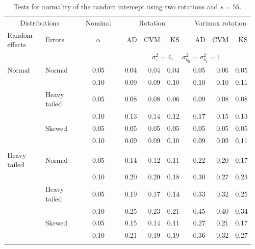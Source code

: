 \documentclass[12pt]{article} %
\begin{document}
\begin{table}[ht]
\caption{Tests for normality of the random intercept using two rotations and $s = 55$.}
\begin{scriptsize}
\begin{center}
\begin{tabular}{ll p{.1cm} c p{.1cm} rrr p{.1cm} rrr}
  \hline
  \multicolumn{2}{c}{Distributions}& & Nominal & &  \multicolumn{3}{c}{Rotation} & & \multicolumn{3}{c}{Varimax rotation} \\ \cline{1-2} \cline{6-8} \cline{10-12}   
  Random effects & Errors & & $\alpha$ & & AD & CVM & KS & & AD & CVM & KS \\ 
   \hline
& && && \multicolumn{7}{c}{$\sigma_{\varepsilon}^2 = 4$, \ \ $\sigma_{b_0}^2 = \sigma_{b_1}^2 = 1$} \\ \cline{6-12}
\rowcolor{gray!20}Normal       & Normal       && 0.05 &&   0.04 & 0.04 & 0.04 && 0.05 & 0.06 & 0.05 \\ 
\rowcolor{gray!20}             &              && 0.10 &&   0.09 & 0.09 & 0.10 && 0.10 & 0.10 & 0.11 \\ 
\rowcolor{gray!20}             & Heavy tailed && 0.05 &&   0.08 & 0.08 & 0.06 && 0.09 & 0.08 & 0.08 \\ 
\rowcolor{gray!20}             &              && 0.10 &&   0.13 & 0.14 & 0.12 && 0.17 & 0.15 & 0.13 \\ 
\rowcolor{gray!20}             & Skewed       && 0.05 &&   0.05 & 0.05 & 0.05 && 0.05 & 0.05 & 0.05 \\ 
\rowcolor{gray!20}             &              && 0.10 &&   0.09 & 0.09 & 0.10 && 0.09 & 0.09 & 0.11 \\ 
             &&&&&&&&&&&\\
Heavy tailed & Normal       && 0.05 &&   0.14 & 0.12 & 0.11 && 0.22 & 0.20 & 0.17 \\ 
             &              && 0.10 &&   0.20 & 0.20 & 0.18 && 0.30 & 0.27 & 0.23 \\ 
             & Heavy tailed && 0.05 &&   0.19 & 0.17 & 0.14 && 0.33 & 0.32 & 0.25 \\ 
             &              && 0.10 &&   0.25 & 0.23 & 0.21 && 0.45 & 0.40 & 0.34 \\ 
             & Skewed       && 0.05 &&   0.15 & 0.14 & 0.11 && 0.27 & 0.21 & 0.17 \\ 
             &              && 0.10 &&   0.21 & 0.19 & 0.19 && 0.36 & 0.32 & 0.27 \\ 
             &&&&&&&&&&&\\

\end{tabular}
\end{center}
\end{scriptsize}
\end{table}
\end{document}
